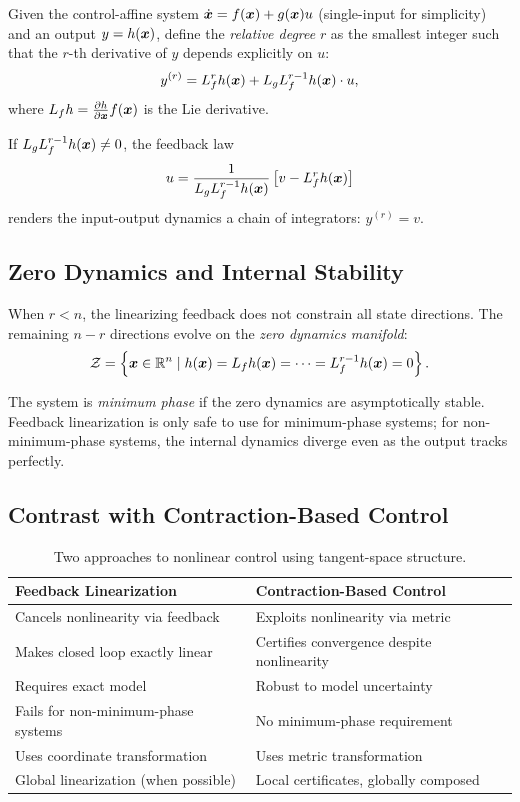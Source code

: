 Given the control-affine system $\dot{\bm{x}} = f(\bm{x}) + g(\bm{x}) u$ (single-input for
simplicity) and an output $y = h(\bm{x})$, define the \emph{relative degree} $r$ as
the smallest integer such that the $r$-th derivative of $y$ depends explicitly on $u$:
\begin{equation}
y^{(r)} = L_f^r h(\bm{x}) + L_g L_f^{r-1} h(\bm{x}) \cdot u,
\label{eq:ch3:io-linearization}
\end{equation}
where $L_f h = \frac{\partial h}{\partial \bm{x}} f(\bm{x})$ is the Lie derivative.

If $L_g L_f^{r-1} h(\bm{x}) \neq 0$, the feedback law
\begin{equation}
u = \frac{1}{L_g L_f^{r-1} h(\bm{x})} \left[ v - L_f^r h(\bm{x}) \right]
\label{eq:ch3:linearizing-feedback}
\end{equation}
renders the input-output dynamics a chain of integrators: $y^{(r)} = v$.

\subsection{Zero Dynamics and Internal Stability}

When $r < n$, the linearizing feedback does not constrain all state directions. The
remaining $n - r$ directions evolve on the \emph{zero dynamics manifold}:
\begin{equation}
\mathcal{Z} = \left\{ \bm{x} \in \mathbb{R}^n \mid h(\bm{x}) = L_f h(\bm{x}) = \cdots = L_f^{r-1} h(\bm{x}) = 0 \right\}.
\end{equation}

The system is \emph{minimum phase} if the zero dynamics are asymptotically stable.
Feedback linearization is only safe to use for minimum-phase systems; for
non-minimum-phase systems, the internal dynamics diverge even as the output tracks
perfectly.

\subsection{Contrast with Contraction-Based Control}

\begin{table}[h]
\centering
\caption{Two approaches to nonlinear control using tangent-space structure.}
\label{tab:ch3:fl-vs-contraction}
\begin{tabular}{@{}p{5cm}p{5cm}@{}}
\toprule
\textbf{Feedback Linearization} & \textbf{Contraction-Based Control} \\
\midrule
Cancels nonlinearity via feedback & Exploits nonlinearity via metric \\
Makes closed loop exactly linear & Certifies convergence despite nonlinearity \\
Requires exact model & Robust to model uncertainty \\
Fails for non-minimum-phase systems & No minimum-phase requirement \\
Uses coordinate transformation & Uses metric transformation \\
Global linearization (when possible) & Local certificates, globally composed \\
\bottomrule
\end{tabular}
\end{table}


